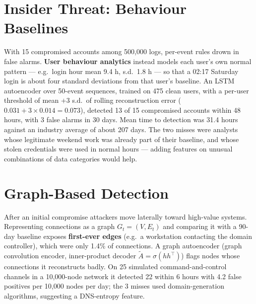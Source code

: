 \documentclass[11pt]{article}
\begin{document}
\section{Insider Threat: Behaviour Baselines}
With 15 compromised accounts among 500,000 logs, per-event rules drown in false alarms. \textbf{User behaviour analytics} instead models each user's own normal pattern --- e.g.\ login hour mean 9.4 h, s.d.\ 1.8 h --- so that a 02:17 Saturday login is about four standard deviations from that user's baseline. An LSTM autoencoder over 50-event sequences, trained on 475 clean users, with a per-user threshold of mean $+3$ s.d.\ of rolling reconstruction error ($0.031+3\times0.014=0.073$), detected 13 of 15 compromised accounts within 48 hours, with 3 false alarms in 30 days. Mean time to detection was 31.4 hours against an industry average of about 207 days. The two misses were analysts whose legitimate weekend work was already part of their baseline, and whose stolen credentials were used in normal hours --- adding features on unusual combinations of data categories would help.

\section{Graph-Based Detection}
After an initial compromise attackers move laterally toward high-value systems. Representing connections as a graph $G_t=(V,E_t)$ and comparing it with a 90-day baseline exposes \textbf{first-ever edges} (e.g.\ a workstation contacting the domain controller), which were only 1.4\% of connections. A graph autoencoder (graph convolution encoder, inner-product decoder $\tilde A=\sigma(hh^\top)$) flags nodes whose connections it reconstructs badly. On 25 simulated command-and-control channels in a 10,000-node network it detected 22 within 6 hours with 4.2 false positives per 10,000 nodes per day; the 3 misses used domain-generation algorithms, suggesting a DNS-entropy feature.
\end{document}
